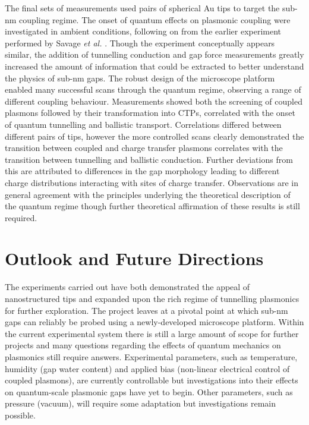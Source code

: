\documentclass[12pt, a4paper, oneside]{book}
\begin{document}
The final sets of measurements used pairs of spherical Au tips to target the sub-nm coupling regime. The onset of quantum effects on plasmonic coupling were investigated in ambient conditions, following on from the earlier experiment performed by Savage \emph{et al.} \cite{savage2012}. Though the experiment conceptually appears similar, the addition of tunnelling conduction and gap force measurements greatly increased the amount of information that could be extracted to better understand the physics of sub-nm gaps. The robust design of the microscope platform enabled many successful scans through the quantum regime, observing a range of different coupling behaviour. Measurements showed both the screening of coupled plasmons followed by their transformation into CTPs, correlated with the onset of quantum tunnelling and ballistic transport. Correlations differed between different pairs of tips, however the more controlled scans clearly demonstrated the transition between coupled and charge transfer plasmons correlates with the transition between tunnelling and ballistic conduction. Further deviations from this are attributed to differences in the gap morphology leading to different charge distributions interacting with sites of charge transfer. Observations are in general agreement with the principles underlying the theoretical description of the quantum regime though further theoretical affirmation of these results is still required.

\section{Outlook and Future Directions}

The experiments carried out have both demonstrated the appeal of nanostructured tips and expanded upon the rich regime of tunnelling plasmonics for further exploration. The project leaves at a pivotal point at which sub-nm gaps can reliably be probed using a newly-developed microscope platform. Within the current experimental system there is still a large amount of scope for further projects and many questions regarding the effects of quantum mechanics on plasmonics still require answers. Experimental parameters, such as temperature, humidity (gap water content) and applied bias (non-linear electrical control of coupled plasmons), are currently controllable but investigations into their effects on quantum-scale plasmonic gaps have yet to begin. Other parameters, such as pressure (vacuum), will require some adaptation but investigations remain possible.
\end{document}
